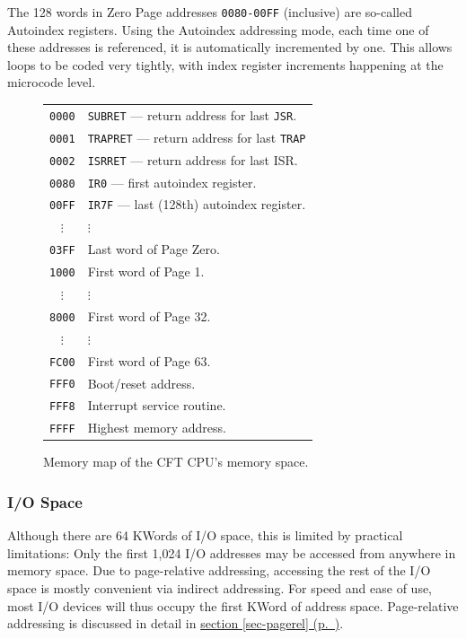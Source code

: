 \documentclass[11pt,a4paper,twocolumns]{article}
\newcommand{\cf}[2][section]{\hyperref[#2]{#1 \ref*{#2} (p.~\pageref*{#2})}}
\begin{document}
The 128 words in Zero Page addresses {\tt 0080-00FF} (inclusive) are
so-called Autoindex registers. Using the Autoindex addressing mode,
each time one of these addresses is referenced, it is automatically
incremented by one. This allows loops to be coded very tightly, with
index register increments happening at the microcode level.

\begin{figure}[bt]
  \centering
  \begin{tabular}{cl}
    {\tt 0000} & {\tt SUBRET} — return address for last {\tt JSR}.\\
    {\tt 0001} & {\tt TRAPRET} — return address for last {\tt TRAP}\\
    {\tt 0002} & {\tt ISRRET} — return address for last ISR.\\
    {\tt 0080} & {\tt IR0} — first autoindex register.\\
    {\tt 00FF} & {\tt IR7F} — last (128th) autoindex register.\\
    $\vdots$ & $\vdots$ \\
    {\tt 03FF} & Last word of Page Zero.\\
    {\tt 1000} & First word of Page 1.\\
    $\vdots$ & $\vdots$ \\
    {\tt 8000} & First word of Page 32.\\
    $\vdots$ & $\vdots$ \\
    {\tt FC00} & First word of Page 63.\\
    {\tt FFF0} & Boot/reset address.\\
    {\tt FFF8} & Interrupt service routine.\\
    {\tt FFFF} & Highest memory address.\\
  \end{tabular}
  \caption{\label{fig-mm}Memory map of the CFT CPU's memory space.}
\end{figure}

\subsubsection{I/O Space}

Although there are 64 KWords of I/O space, this is limited by
practical limitations: Only the first 1,024 I/O addresses may be
accessed from anywhere in memory space. Due to page-relative
addressing, accessing the rest of the I/O space is mostly convenient
via indirect addressing. For speed and ease of use, most I/O devices
will thus occupy the first KWord of address space. Page-relative
addressing is discussed in detail in \cf{sec-pagerel}.
\end{document}
